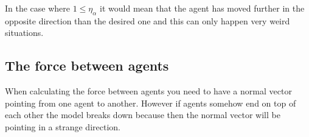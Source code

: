 In the case where $1 \leq \eta_{\alpha}$ it would mean that the agent has moved 
further in the opposite direction than the desired one and this can only happen very 
weird situations.

\subsection{The force between agents}
When calculating the force between agents you need to have a normal vector 
pointing from one agent to another. However if agents somehow end on top of 
each other the model breaks down because then the normal vector will be pointing 
in a strange direction.